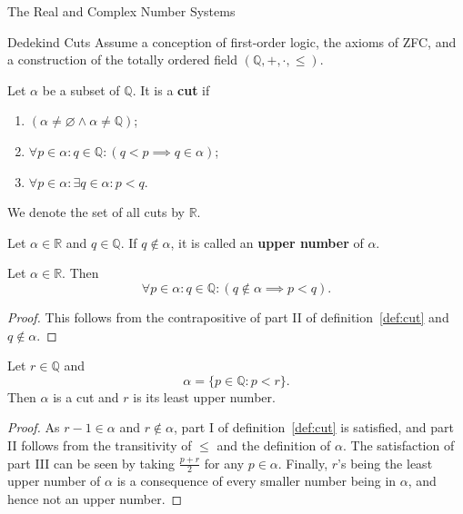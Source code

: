 \begin{chapter}{The Real and Complex Number Systems}

\begin{section}{Dedekind Cuts}
\label{sec:dedekind-cuts}
	Assume a conception of first-order logic, the axioms of ZFC, and a 
	construction of the totally ordered field $(\mathbb{Q}, +, \cdot, \leq)$. 

	\begin{definition}
	\label{def:cut}
		Let $\alpha$ be a subset of $\mathbb{Q}$. It is a \textbf{cut} if
		\begin{enumerate}[label=\Roman*.]
			\item $(\alpha \neq \varnothing \land \alpha \neq \mathbb{Q})$;
			\item $\forall p \in \alpha : q \in \mathbb{Q} : (q < p \implies q \in
				\alpha)$;
			\item $\forall p \in \alpha : \exists q \in \alpha : p < q$.
		\end{enumerate}
		We denote the set of all cuts by $\mathbb{R}$.
	\end{definition}

	\begin{definition}
	\label{def:upper-number}
		Let $\alpha \in \mathbb{R}$ and $q \in \mathbb{Q}$. If $q \nin
		\alpha$, it is called an \textbf{upper number} of $\alpha$.
	\end{definition}

	\begin{theorem}
	\label{thm:cut-upper-number-inequality}
		Let $\alpha \in \mathbb{R}$. Then
		\[ \forall p \in \alpha : q \in \mathbb{Q} :
			(q \nin \alpha \implies p < q). \] 
	\end{theorem}

	\begin{proof}
		This follows from the contrapositive of part II of definition~\ref{def:cut}
		and $q \nin \alpha$.
	\end{proof}

	\begin{theorem}
	\label{thm:rational-least-upper-number}
		Let $r \in \mathbb{Q}$ and
		\[ \alpha = \{p \in \mathbb{Q} : p < r\}. \] 
		Then $\alpha$ is a cut and $r$ is its least upper number.
	\end{theorem}

	\begin{proof}
		As $r - 1 \in \alpha$ and $r \nin \alpha$, part I of
		definition~\ref{def:cut} is satisfied, and part II follows from the
		transitivity of $\leq$ and the definition of $\alpha$. The
		satisfaction of part III can be seen by taking $\frac{p + r}{2}$ for any
		$p \in \alpha$. Finally, $r$'s being the least upper number of
		$\alpha$ is a consequence of every smaller number being in $\alpha$,
		and hence not an upper number.
	\end{proof}


\end{section}
\end{chapter}
